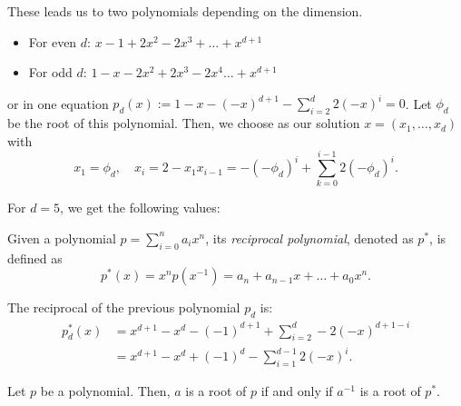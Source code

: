 \documentclass[english,version-2020-11]{uzl-thesis}
\begin{document}
These leads us to two polynomials depending on the dimension.
\begin{itemize}
  \item For even $d$: $x - 1 + 2 x^2 - 2 x^3 + \dots + x^{d+1}$
  \item For odd $d$: $1 - x - 2 x^2 + 2 x^3 - 2 x^4 \dots + x^{d+1}$
\end{itemize}
or in one equation $p_d(x) := 1 - x - (-x)^{d+1} - \sum_{i = 2}^{d} 2 (-x)^{i} = 0$.
Let $\phi_d$ be the root of this polynomial.
Then, we choose as our solution $x = (x_1, \dots, x_d)$ with
\begin{equation}
  \label{eq:solution}
  x_1 = \phi_d, \quad x_i = 2 - x_1 x_{i-1} = -(-\phi_d)^i + \sum_{k=0}^{i-1} 2 (-\phi_d)^i.
\end{equation}

\begin{example}
  For $d = 5$, we get the following values:

\end{example}

\begin{definition}
  Given a polynomial $p = \sum_{i=0}^n a_i x^n$, its \emph{reciprocal polynomial},
  denoted as $p^*$, is defined as
  \[
    p^*(x) = x^n p(x^{-1}) = a_n + a_{n-1} x + \dots + a_0 x^n.
  \]
\end{definition}

\begin{example}
  The reciprocal of the previous polynomial $p_d$ is:
  \begin{align*}
    p_d^*(x) & = x^{d+1} - x^d - (-1)^{d+1} + \sum_{i = 2}^{d} -2 (-x)^{d + 1 - i} \\
             & = x^{d+1} - x^d + (-1)^d - \sum_{i = 1}^{d - 1} 2 (-x)^i.
  \end{align*}
\end{example}

\begin{lemma}
  Let $p$ be a polynomial. Then, $a$ is a root of $p$ if and only if $a^{-1}$ is a root of $p^*$.
\end{lemma}
\end{document}
